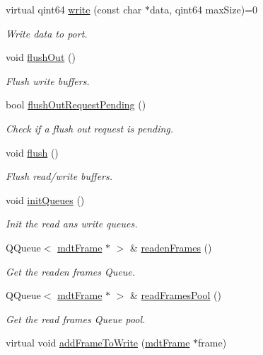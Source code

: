 \begin{DoxyCompactItemize}
virtual qint64 \hyperlink{classmdt_abstract_port_a64d4802975a76474b9196c91f57a6d90}{write} (const char $\ast$data, qint64 maxSize)=0
\begin{DoxyCompactList}\small\item\em Write data to port. \end{DoxyCompactList}\item 
void \hyperlink{classmdt_abstract_port_ad199c6310801893f1f7de2a2391606fc}{flushOut} ()
\begin{DoxyCompactList}\small\item\em Flush write buffers. \end{DoxyCompactList}\item 
bool \hyperlink{classmdt_abstract_port_a2cc79d9288bebafaa183753dcf0807f3}{flushOutRequestPending} ()
\begin{DoxyCompactList}\small\item\em Check if a flush out request is pending. \end{DoxyCompactList}\item 
void \hyperlink{classmdt_abstract_port_abde440c49b95833f821e1333c40a7398}{flush} ()
\begin{DoxyCompactList}\small\item\em Flush read/write buffers. \end{DoxyCompactList}\item 
void \hyperlink{classmdt_abstract_port_adf06d095d6c3e6ce939a3998bcf8b829}{initQueues} ()
\begin{DoxyCompactList}\small\item\em Init the read ans write queues. \end{DoxyCompactList}\item 
QQueue$<$ \hyperlink{classmdt_frame}{mdtFrame} $\ast$ $>$ \& \hyperlink{classmdt_abstract_port_a05356a33dc546a11d2794a0419d749e0}{readenFrames} ()
\begin{DoxyCompactList}\small\item\em Get the readen frames Queue. \end{DoxyCompactList}\item 
QQueue$<$ \hyperlink{classmdt_frame}{mdtFrame} $\ast$ $>$ \& \hyperlink{classmdt_abstract_port_a3850ab819a8fc5dad22af14b74c45274}{readFramesPool} ()
\begin{DoxyCompactList}\small\item\em Get the read frames Queue pool. \end{DoxyCompactList}\item 
virtual void \hyperlink{classmdt_abstract_port_a9a69eb2fc07d551ab37c011487fa319d}{addFrameToWrite} (\hyperlink{classmdt_frame}{mdtFrame} $\ast$frame)

\end{DoxyCompactItemize}
